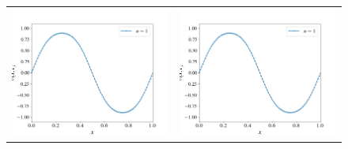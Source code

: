 \documentclass[12pt, reqno]{report}
\theoremstyle{definition}
\theoremstyle{remark}
\begin{document}
\begin{figure}[H]
\begin{tabular}{cc}
        \includegraphics[width = \acfdwidth]{media_paper/stable_AC_CN_1} &
        \includegraphics[width = \acfdwidth]{media_paper/stable_AC_CN_1} \\

\end{tabular}
\end{figure}
\end{document}
